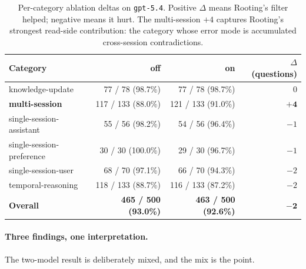 \documentclass[10pt,a4paper]{article}
\begin{document}
\begin{table}[t]
\centering
\footnotesize
\caption{Per-category ablation deltas on \texttt{gpt-5.4}. Positive $\Delta$
means Rooting's filter helped; negative means it hurt. The multi-session
$+4$ captures Rooting's strongest read-side contribution: the category
whose error mode is accumulated cross-session contradictions.}
\label{tab:ablation-cat}
\begin{tabular}{@{}lrrr@{}}
\toprule
Category & off & on & $\Delta$ (questions) \\
\midrule
knowledge-update          & 77 / 78   (98.7\%) & 77 / 78   (98.7\%) &  $0$ \\
\textbf{multi-session}    & 117 / 133 (88.0\%) & 121 / 133 (91.0\%) & $\mathbf{+4}$ \\
single-session-assistant  & 55 / 56   (98.2\%) & 54 / 56   (96.4\%) & $-1$ \\
single-session-preference & 30 / 30  (100.0\%) & 29 / 30   (96.7\%) & $-1$ \\
single-session-user       & 68 / 70   (97.1\%) & 66 / 70   (94.3\%) & $-2$ \\
temporal-reasoning        & 118 / 133 (88.7\%) & 116 / 133 (87.2\%) & $-2$ \\
\midrule
\textbf{Overall}          & \textbf{465 / 500 (93.0\%)} & \textbf{463 / 500 (92.6\%)} & $\mathbf{-2}$ \\
\bottomrule
\end{tabular}
\end{table}

\paragraph{Three findings, one interpretation.}
The two-model result is deliberately mixed, and the mix is the point.
\end{document}
